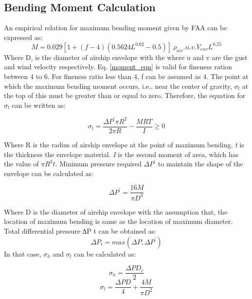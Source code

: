\subsection{Bending Moment Calculation}

An empirical relation for maximum bending moment given by FAA  can be expressed as:
\begin{equation}
\label{moment_eqn}
M = 0.029 [1 + (f-4)(0.5624L^{0.02} - 0.5)]\ \rho _{air} . u . v . V_{env} L^{0.25}
\end{equation}
Where D, is the diameter of airship envelope with the where u and v are the gust and wind velocity respectively. Eq. \ref{moment_eqn} is valid for fineness ration between 4 to 6. For fineness ratio less than 4, f can be assumed as 4.
The point at which the maximum bending moment occurs, i.e., near the center of gravity, $ \sigma _{l} $ at the top of this must be greater than or equal to zero. Therefore, the equation for $ \sigma _{l} $ can be written as:

\begin{equation}
\label{eqn_for_sima_l}
\sigma _{l} = \dfrac{ \Delta P^{'} \pi R^{2} } {2 \pi R } - \frac{MRT}{I} \ge 0
\end{equation}

Where R is the radius of airship envelope at the point of maximum bending. \textit{t} is the thickness the envelope material. \textit{I} is the second moment of area, which has the value of $ \pi R^{3} t $. Minimum pressure required $ \Delta P^{'} $ to maintain the shape of the envelope can be calculated as:

\begin{equation}
\Delta P^{'} = \frac{16M}{\pi D^{3} }
\end{equation}

Where D is the diameter of airship envelope with the assumption that, the location of maximum bending is same as the location of maximum diameter. Total differential pressure ∆P t can be obtained as:
\begin{equation}
\Delta P_{t} = max(\Delta P , \Delta P ^{'})
\end{equation}
In that case, $ \sigma _{h} $ and  $ \sigma _{l} $ can be calculated as:

\begin{equation}
\sigma _{h} = \frac{\Delta P D_{c}}{2}
\end{equation}
\begin{equation}
\sigma _{l} = \frac{\Delta P D}{4} + \frac{4M}{\pi D^{2} }
\end{equation}

